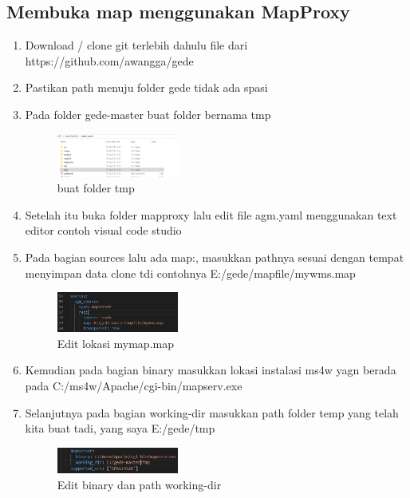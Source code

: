 \subsection{Membuka map menggunakan MapProxy}
\begin{enumerate}
  \item Download / clone git terlebih dahulu file dari https://github.com/awangga/gede
  \item Pastikan path menuju folder gede tidak ada spasi 
  \hfill\break
  
  \item Pada folder gede-master buat folder bernama tmp
  \hfill\break
  \begin{figure}[H]
  \includegraphics[width=4cm]{figures/Tugas4/1174084/11.png}
  \centering
  \caption{buat folder tmp}
  \end{figure}
 
  \item Setelah itu buka folder mapproxy lalu edit file agm.yaml menggunakan text editor contoh visual code studio
  \item Pada bagian sources lalu ada map:, masukkan pathnya sesuai dengan tempat menyimpan data clone tdi contohnya E:/gede/mapfile/mywms.map
  \hfill\break
  \begin{figure}[H]
  \includegraphics[width=4cm]{figures/Tugas4/1174084/12.png}
  \centering
  \caption{Edit lokasi mymap.map}
  \end{figure}


  \item Kemudian pada bagian binary masukkan lokasi instalasi ms4w yagn berada pada C:/ms4w/Apache/cgi-bin/mapserv.exe
  \item Selanjutnya pada bagian working-dir masukkan path folder temp yang telah kita buat tadi, yang saya E:/gede/tmp
  \hfill\break
  \begin{figure}[H]
  \includegraphics[width=4cm]{figures/Tugas4/1174084/13.png}
  \centering
  \caption{Edit binary dan path working-dir}
  \end{figure}


\end{enumerate}
